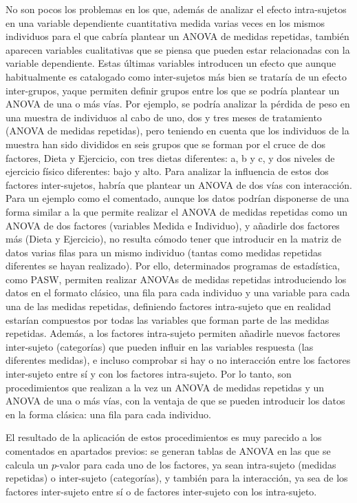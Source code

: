 \documentclass[
  spanish,
  a4paper,
]{scrreport}
\theoremstyle{plain}
\theoremstyle{definition}
\theoremstyle{definition}
\theoremstyle{remark}
\begin{document}
No son pocos los problemas en los que, además de analizar el efecto
intra-sujetos en una variable dependiente cuantitativa medida varias
veces en los mismos individuos para el que cabría plantear un ANOVA de
medidas repetidas, también aparecen variables cualitativas que se piensa
que pueden estar relacionadas con la variable dependiente. Estas últimas
variables introducen un efecto que aunque habitualmente es catalogado
como inter-sujetos más bien se trataría de un efecto inter-grupos, yaque
permiten definir grupos entre los que se podría plantear un ANOVA de una
o más vías. Por ejemplo, se podría analizar la pérdida de peso en una
muestra de individuos al cabo de uno, dos y tres meses de tratamiento
(ANOVA de medidas repetidas), pero teniendo en cuenta que los individuos
de la muestra han sido divididos en seis grupos que se forman por el
cruce de dos factores, Dieta y Ejercicio, con tres dietas diferentes: a,
b y c, y dos niveles de ejercicio físico diferentes: bajo y alto. Para
analizar la influencia de estos dos factores inter-sujetos, habría que
plantear un ANOVA de dos vías con interacción. Para un ejemplo como el
comentado, aunque los datos podrían disponerse de una forma similar a la
que permite realizar el ANOVA de medidas repetidas como un ANOVA de dos
factores (variables Medida e Individuo), y añadirle dos factores más
(Dieta y Ejercicio), no resulta cómodo tener que introducir en la matriz
de datos varias filas para un mismo individuo (tantas como medidas
repetidas diferentes se hayan realizado). Por ello, determinados
programas de estadística, como PASW, permiten realizar ANOVAs de medidas
repetidas introduciendo los datos en el formato clásico, una fila para
cada individuo y una variable para cada una de las medidas repetidas,
definiendo factores intra-sujeto que en realidad estarían compuestos por
todas las variables que forman parte de las medidas repetidas. Además, a
los factores intra-sujeto permiten añadirle nuevos factores inter-sujeto
(categorías) que pueden influir en las variables respuesta (las
diferentes medidas), e incluso comprobar si hay o no interacción entre
los factores inter-sujeto entre sí y con los factores intra-sujeto. Por
lo tanto, son procedimientos que realizan a la vez un ANOVA de medidas
repetidas y un ANOVA de una o más vías, con la ventaja de que se pueden
introducir los datos en la forma clásica: una fila para cada individuo.

El resultado de la aplicación de estos procedimientos es muy parecido a
los comentados en apartados previos: se generan tablas de ANOVA en las
que se calcula un \(p\)-valor para cada uno de los factores, ya sean
intra-sujeto (medidas repetidas) o inter-sujeto (categorías), y también
para la interacción, ya sea de los factores inter-sujeto entre sí o de
factores inter-sujeto con los intra-sujeto.
\end{document}
